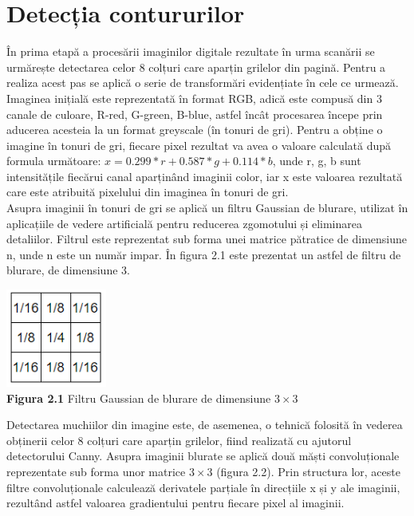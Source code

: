 \documentclass[a4paper,12pt]{report}
\newcommand\tab[1][1cm]{\hspace*{#1}}
\begin{document}
\section {Detecția contururilor}
\tab În prima etapă a procesării imaginilor digitale rezultate în urma scanării se urmărește detectarea celor 8 colțuri care aparțin grilelor din pagină. Pentru a realiza acest 
pas se aplică o serie de transformări evidențiate în cele ce urmează.
\\ \tab Imaginea inițială este reprezentată în format RGB, adică este compusă din 3 canale de culoare, R-red, G-green, B-blue, astfel încât procesarea începe prin aducerea acesteia la un format greyscale (în tonuri de gri).  
Pentru a obține o imagine în tonuri de gri, fiecare pixel rezultat va avea o valoare calculată după formula următoare: $x=0.299*r+0.587*g+0.114*b$, unde r, g, b sunt intensitățile fiecărui canal aparținând imaginii color, iar x este valoarea 
rezultată care este atribuită pixelului din imaginea în tonuri de gri\cite{book1}.
\\ \tab Asupra imaginii în tonuri de gri se aplică un filtru Gaussian de blurare\cite{book2}, utilizat în aplicațiile de vedere artificială pentru reducerea zgomotului și eliminarea detaliilor. Filtrul este reprezentat sub forma unei matrice pătratice de dimensiune n,
unde n este un număr impar. În figura 2.1 este prezentat un astfel de filtru de blurare, de dimensiune 3. 
\begin {center} 
	\begin {footnotesize} 
		\includegraphics[width =33mm]{fig2_1} \\
		\textbf  {Figura 2.1} Filtru Gaussian de blurare de dimensiune $3\times3$
	\end {footnotesize} 
\end {center}
\tab Detectarea muchiilor din imagine este, de asemenea, o tehnică folosită în vederea obținerii celor 8 colțuri care aparțin grilelor, fiind realizată cu ajutorul detectorului Canny. Asupra imaginii blurate se aplică două măști convoluționale
reprezentate sub forma unor matrice $3\times3$ (figura 2.2). Prin structura lor, aceste filtre convoluționale calculează derivatele parțiale în direcțiile x și y ale imaginii, rezultând astfel valoarea gradientului pentru fiecare pixel al imaginii.
\end{document}

